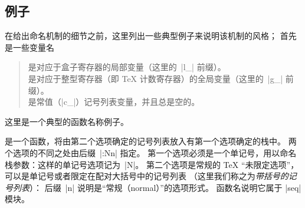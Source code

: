 \documentclass{l3doc}
\begin{document}
\subsection{例子}
%
在给出命名机制的细节之前，这里列出一些典型例子来说明该机制的风格；
首先是一些变量名
\begin{quote}
     是对应于盒子寄存器的局部变量（这里的~|l_| 前缀）。\\
     是对应于整型寄存器（即 \TeX{} 计数寄存器）的全局变量（这里的~|g_| 前缀）。\\
     是常值（|c_|）记号列表变量，并且总是空的。
\end{quote}
%
这里是一个典型的函数名称例子。

%
%
 是一个函数，将由第二个选项确定的记号列表放入有第一个选项确定的栈中。
两个选项的不同之处由后缀~|:Nn| 指定。
第一个选项必须是一个单记号，用以命名栈参数：这样的单记号选项记为~|N|。
第二个选项是常规的 \TeX{} “未限定选项”，可以是单记号或者限定在配对大括号中的记号列表
（这里我们称之为\emph{带括号的记号列表}）：
后缀~|n| 说明是“常规（normal）”的选项形式。
函数名说明它属于 |seq| 模块。
\end{document}
